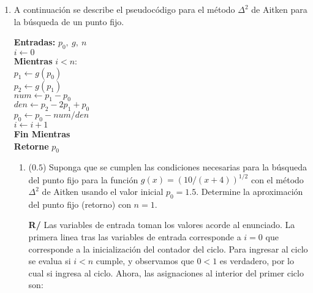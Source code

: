 \documentclass[12pt]{article}
\begin{document}

\vspace{-.5cm}
  \begin{enumerate}[leftmargin=*,widest=9]

    \item A continuación se describe el pseudocódigo para el método \(\Delta^2\) de Aitken para la búsqueda de un punto fijo.

    \small{
    \textbf{Entradas:} \(p_0, \ g, \ n\)\\
    \(i \gets 0\)\\
    \textbf{Mientras} \(i < n\):\\
    \hspace*{.5 cm} \(p_1 \gets g(p_0)\)\\
    \hspace*{.5 cm} \(p_2 \gets g(p_1)\)\\
    \hspace*{.5 cm} \(num \gets p_{1} - p_0\)\\
    \hspace*{.5 cm} \(den \gets p_{2} - 2p_{1} + p_0\)\\
    \hspace*{.5 cm} \(p_0 \gets p_0 - num / den \)\\
    \hspace*{.5 cm} \(i \gets i + 1\)\\
    \textbf{Fin Mientras}\\
    \textbf{Retorne} \(p_0\)
    }

    \begin{enumerate}[label=\alph*]
    \item (\(0.5\)) Suponga que se cumplen las condiciones necesarias para la búsqueda del punto fijo para la función \(g(x) = {(10/(x+4))}^{1/2}\)
    con el método \(\Delta^2\) de Aitken usando el valor inicial \(p_0=1.5\). Determine la aproximación del punto fijo (retorno) con \(n=1\).

\textbf{R/} Las variables de entrada toman los valores acorde al enunciado. La primera linea tras las variables de entrada corresponde a \(i=0\) que corresponde a la inicialización del contador del ciclo. Para ingresar al ciclo se evalua si \(i<n\) cumple, y observamos que \(0 < 1\) es verdadero, por lo cual si ingresa al ciclo. Ahora, las asignaciones al interior del primer ciclo son:


\end{enumerate}
\end{enumerate}
\end{document}
